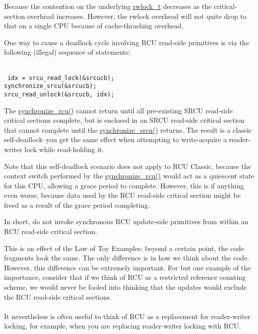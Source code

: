 
Because the contention on the underlying
\url{rwlock_t} decreases as the critical-section overhead
increases.
However, the rwlock overhead will not quite drop to that on a single
CPU because of cache-thrashing overhead.


One way to cause a deadlock cycle involving
RCU read-side primitives is via the following (illegal) sequence
of statements:

\begin{minipage}[t]{\columnwidth}
~\\
{\tt
idx = srcu\_read\_lock(\&srcucb);\\
synchronize\_srcu(\&srcucb);\\
srcu\_read\_unlock(\&srcucb, idx);
}
\end{minipage}
\vspace{5pt}

The \url{synchronize_rcu()} cannot return until all
pre-existing SRCU read-side critical sections complete, but
is enclosed in an SRCU read-side critical section that cannot
complete until the \url{synchronize_srcu()} returns.
The result is a classic self-deadlock--you get the same
effect when attempting to write-acquire a reader-writer lock
while read-holding it.

Note that this self-deadlock scenario does not apply to
RCU Classic, because the context switch performed by the
\url{synchronize_rcu()} would act as a quiescent state
for this CPU, allowing a grace period to complete.
However, this is if anything even worse, because data used
by the RCU read-side critical section might be freed as a
result of the grace period completing.

In short, do not invoke synchronous RCU update-side primitives
from within an RCU read-side critical section.


This is an effect of the Law of Toy Examples:
beyond a certain point, the code fragments look the same.
The only difference is in how we think about the code.
However, this difference can be extremely important.
For but one example of the importance, consider that if we think
of RCU as a restricted reference counting scheme, we would never
be fooled into thinking that the updates would exclude the RCU
read-side critical sections.
\\ ~ \\
It nevertheless is often useful to think of RCU as a replacement
for reader-writer locking, for example, when you are replacing reader-writer
locking with RCU.

